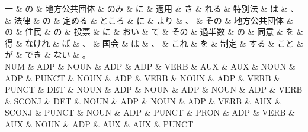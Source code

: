 \documentclass[tikz,border=5pt]{standalone}
\begin{document}
\small
\begin{dependency}[edge unit distance=7.6pt]
    \begin{deptext}[column sep=0.5em]
        一 \& の \& 地方公共団体 \& のみ \& に \& 適用 \& さ \& れる \& 特別法 \& は \& 、 \& 法律 \& の \& 定める \& ところ \& に \& より \& 、 \& その \& 地方公共団体 \& の \& 住民 \& の \& 投票 \& に \& おい \& て \& その \& 過半数 \& の \& 同意 \& を \& 得 \& なけれ \& ば \& 、 \& 国会 \& は \& 、 \& これ \& を \& 制定 \& する \& こと \& が \& でき \& ない \& 。\\
        NUM \& ADP \& NOUN \& ADP \& ADP \& VERB \& AUX \& AUX \& NOUN \& ADP \& PUNCT \& NOUN \& ADP \& VERB \& NOUN \& ADP \& VERB \& PUNCT \& DET \& NOUN \& ADP \& NOUN \& ADP \& NOUN \& ADP \& VERB \& SCONJ \& DET \& NOUN \& ADP \& NOUN \& ADP \& VERB \& AUX \& SCONJ \& PUNCT \& NOUN \& ADP \& PUNCT \& PRON \& ADP \& VERB \& AUX \& NOUN \& ADP \& AUX \& AUX \& PUNCT\\
    \end{deptext}
\end{dependency}
\end{document}
